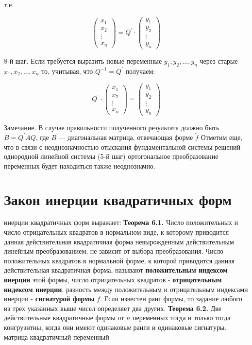 \documentclass[bachelor, och, coursework, times]{SCWorks}
\newcommand\tab[1][1cm]{\hspace*{#1}}
\newcommand{\tl}{\newline\tab}
\begin{document}
т.е.

$$\begin{pmatrix}
x_{1}  \\
x_{2} \\        
\vdots \\
x_{n}
\end{pmatrix} = Q^{'}\cdot\begin{pmatrix}
y_{1}  \\
y_{2} \\        
\vdots \\
y_{n}
\end{pmatrix}$$

8-й шаг. Если требуется выразить новые переменные $y_1, y_2, \dots, y_n$ через старые $x_1, x_2, \dots, x_n$ то, учитывая, что $Q^{-1} = Q^{'}$ получаем: 

$$Q^{'}\cdot\begin{pmatrix}
x_{1}  \\
x_{2} \\        
\vdots \\
x_{n}
\end{pmatrix} = \begin{pmatrix}
y_{1}  \\
y_{2} \\        
\vdots \\
y_{n}
\end{pmatrix}$$

Замечание. В случае правильности полученного результата должно быть $B=Q^{'}AQ$, где $B$ — диагональная матрица, отвечающая форме $\tilde{f}$ Отметим еще, что в связи с неоднозначностью отыскания фундаментальной системы решений однородной линейной системы (5-й шаг) ортогональное преобразование переменных будет находиться также неоднозначно.

\section{Закон инерции квадратичных форм}
 инерции квадратичных форм выражает:
\tl
\textbf{Теорема 6.1.} Число положительных и число отрицательных квадратов в нормальном виде, к которому приводится данная действительная квадратичная форма невырожденным действительным линейным преобразованием, не зависит от выбора преобразования.
\tl
Число положительных квадратов в нормальной форме, к которой приводится данная действительная квадратичная форма, называют \textbf{положительным индексом инерции} этой формы, число отрицательных квадратов - \textbf{отрицательным индексом инерции}, разность между положительным и отрицательным индексами инерции - \textbf{сигнатурой формы} $f$. Если известен ранг формы, то задание любого из трех указанных выше чисел определяет два других.
\tl
\textbf{Теорема 6.2.} Две действительные квадратичные формы от $n$ переменных тогда и только тогда конгруэнтны, когда они имеют одинаковые ранги и одинаковые сигнатуры.
матрица квадратичный переменный
\end{document}
